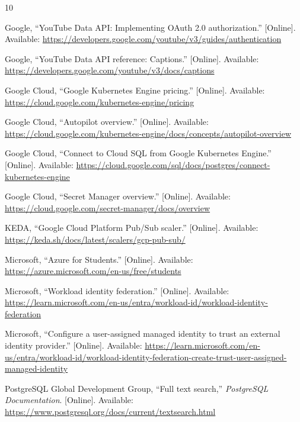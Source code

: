 \documentclass[conference]{IEEEtran}
\begin{document}
\FloatBarrier
\begin{thebibliography}{10}

Google, ``YouTube Data API: Implementing OAuth 2.0 authorization.'' [Online]. Available: \url{https://developers.google.com/youtube/v3/guides/authentication}

Google, ``YouTube Data API reference: Captions.'' [Online]. Available: \url{https://developers.google.com/youtube/v3/docs/captions}

Google Cloud, ``Google Kubernetes Engine pricing.'' [Online]. Available: \url{https://cloud.google.com/kubernetes-engine/pricing}

Google Cloud, ``Autopilot overview.'' [Online]. Available: \url{https://cloud.google.com/kubernetes-engine/docs/concepts/autopilot-overview}

Google Cloud, ``Connect to Cloud SQL from Google Kubernetes Engine.'' [Online]. Available: \url{https://cloud.google.com/sql/docs/postgres/connect-kubernetes-engine}

Google Cloud, ``Secret Manager overview.'' [Online]. Available: \url{https://cloud.google.com/secret-manager/docs/overview}

KEDA, ``Google Cloud Platform Pub/Sub scaler.'' [Online]. Available: \url{https://keda.sh/docs/latest/scalers/gcp-pub-sub/}

Microsoft, ``Azure for Students.'' [Online]. Available: \url{https://azure.microsoft.com/en-us/free/students}

Microsoft, ``Workload identity federation.'' [Online]. Available: \url{https://learn.microsoft.com/en-us/entra/workload-id/workload-identity-federation}

Microsoft, ``Configure a user-assigned managed identity to trust an external identity provider.'' [Online]. Available: \url{https://learn.microsoft.com/en-us/entra/workload-id/workload-identity-federation-create-trust-user-assigned-managed-identity}

PostgreSQL Global Development Group, ``Full text search,'' \emph{PostgreSQL Documentation}. [Online]. Available: \url{https://www.postgresql.org/docs/current/textsearch.html}

\end{thebibliography}
\end{document}
